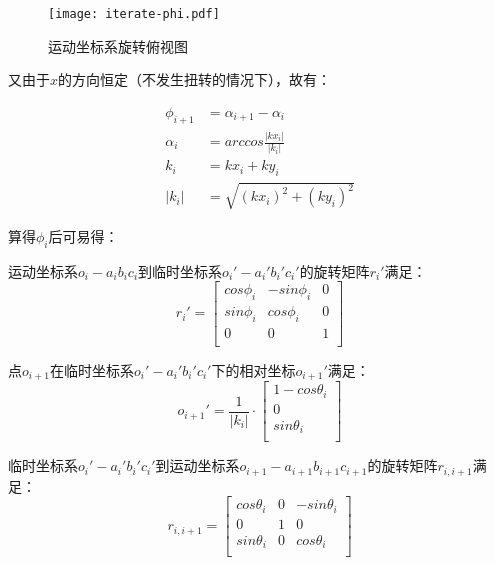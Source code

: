 \begin{itemize}
\FloatBarrier
\begin{figure}
\centering
\texttt{[image: iterate-phi.pdf]}
\caption{运动坐标系旋转俯视图}
\label{fig:iterate-phi} 
\end{figure}
\FloatBarrier

又由于$x$的方向恒定（不发生扭转的情况下），故有：

\begin{align}
\phi_{i+1} &= \alpha_{i+1} - \alpha_i \\
\alpha_i &= arccos\frac{|kx_i|}{|k_i|} \\
k_i &= kx_i + ky_i \\
|k_i| &= \sqrt{(kx_i)^2 + (ky_i)^2}
\end{align}

算得$\phi_i$后可易得：

运动坐标系$o_i-a_ib_ic_i$到临时坐标系$o_i'-a_i'b_i'c_i'$的旋转矩阵$r_i'$满足：
    \begin{equation}
    r_i' = \left[
            \begin{matrix}
            cos\phi_i & -sin\phi_i & 0\\
            sin\phi_i & cos\phi_i & 0\\
            0 & 0 & 1\\
            \end{matrix}
        \right]
    \end{equation}
    
点$o_{i+1}$在临时坐标系$o_i'-a_i'b_i'c_i'$下的相对坐标$o_{i+1}'$满足：
    \begin{equation}
    o_{i+1}' = \frac{1}{|k_i|} \cdot \left[
      \begin{matrix}
    	1 - cos\theta_i\\
    	0 \\
      sin\theta_i\\
      \end{matrix}
    \right]
    \end{equation}
    
临时坐标系$o_i'-a_i'b_i'c_i'$到运动坐标系$o_{i+1}-a_{i+1}b_{i+1}c_{i+1}$的旋转矩阵$r_{i, i+1}$满足：
    \begin{equation}
    r_{i, i+1} = \left[
      \begin{matrix}
      cos \theta_i & 0 & -sin \theta_i\\
      0 &1 & 0\\
      sin \theta_i & 0 & cos \theta_i\\
      \end{matrix}
    \right]
    \end{equation}


\end{itemize}
